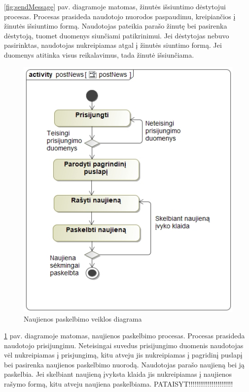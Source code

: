 \documentclass{VUMIFPSkursinis}
\begin{document}
	\ref{fig:sendMessage} pav. diagramoje matomas, žinutės išsiuntimo dėstytojui procesas. Procesas prasideda naudotojo
	nuorodos paspaudimu, kreipiančios į žinutės išsiuntimo formą. Naudotojas pateikia parašo žinutę bei pasirenka dėstytoją, tuomet duomenys siunčiami patikrinimui. Jei dėstytojas nebuvo pasirinktas, naudotojas nukreipiamas
	atgal į žinutės siuntimo formą. Jei duomenys atitinka visus reikalavimus, tada žinutė išsiunčiama.
	\begin{figure}[H]
		\centering
		\includegraphics[scale=0.65]{img/postNews.jpg}
		\caption{Naujienos paskelbimo veiklos diagrama}
		\label{fig:postNews}
	\end{figure}
	\ref{fig:postNews} pav. diagramoje matomas, naujienos paskelbimo procesas. Procesas prasideda naudotojo prisijungimu. Neteisingai suvedus prisijungimo duomenis naudotojas vėl nukreipiamas į prisjungimą, kitu atveju jis nukreipiamas į pagridinį puslapį bei pasirenka naujienos paskelbimo nuorodą. Naudotojas parašo naujieną bei ją paskelbia. Jei skelbiant naujieną įvyksta klaida jis nukreipiamas į naujienos rašymo formą, kitu atveju naujiena paskelbiama.
	\newpage
{}
PATAISYT!!!!!!!!!!!!!!!!!!!!!!!
\end{document}

